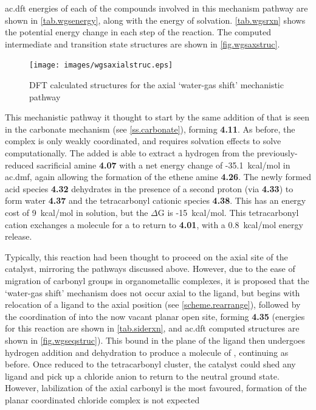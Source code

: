 \Gls{ac.dft} energies of each of the compounds involved in this mechanism pathway are shown in \autoref{tab.wgsenergy}, along with the energy of solvation. \autoref{tab.wgsrxn} shows the potential energy change in each step of the reaction. The computed intermediate and transition state structures are shown in \autoref{fig.wgsaxstruc}.




\begin{figure}[!htb]
 \begin{center}
  \texttt{[image: images/wgsaxialstruc.eps]}
 \end{center}
\caption{DFT calculated structures for the axial `water-gas shift' mechanistic pathway}
\label{fig.wgsaxstruc}
\end{figure}

This mechanistic pathway it thought to start by the same addition of  that is seen in the carbonate mechanism (see \autoref{ss.carbonate}), forming \textbf{4.11}. As before, the complex is only weakly coordinated, and requires solvation effects to solve computationally. The added  is able to extract a hydrogen from the previously-reduced sacrificial amine \textbf{4.07} with a net energy change of -35.1~kcal/mol in \gls{ac.dmf}, again allowing the formation of the ethene amine \textbf{4.26}. The newly formed acid species \textbf{4.32} dehydrates in the presence of a second proton (via \textbf{4.33}) to form water \textbf{4.37} and the tetracarbonyl cationic species \textbf{4.38}. This has an energy cost of 9~kcal/mol in solution, but the $\Delta$G is -15~kcal/mol. This tetracarbonyl cation exchanges a  molecule for a  to return to \textbf{4.01}, with a 0.8~kcal/mol energy release. 

Typically, this reaction had been thought to proceed on the axial site of the catalyst, mirroring the pathways discussed above. However, due to the ease of migration of carbonyl groups in organometallic complexes, it is proposed that the `water-gas shift' mechanism does not occur axial to the ligand, but begins with relocation of a  ligand to the axial position (see \autoref{scheme.rearrange}), followed by the coordination of  into the now vacant planar open site, forming \textbf{4.35} (energies for this reaction are shown in \autoref{tab.siderxn}, and \gls{ac.dft} computed structures are shown in \autoref{fig.wgseqstruc}). This  bound in the plane of the ligand then undergoes hydrogen addition and dehydration to produce a molecule of , continuing as before. Once reduced to the tetracarbonyl cluster, the catalyst could shed any  ligand and pick up a chloride anion to return to the neutral ground state. However, labilization of the axial carbonyl is the most favoured, formation of the planar coordinated chloride complex is not expected\autocite{shaver1992}

